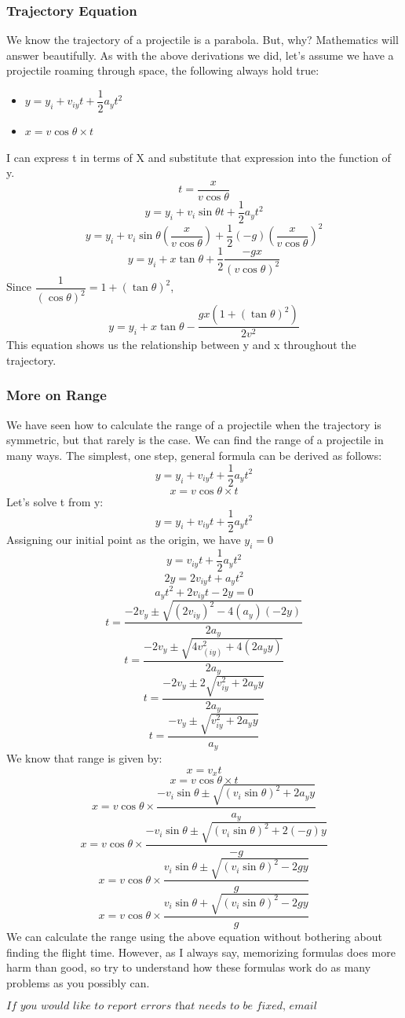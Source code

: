 \documentclass[9pt]{article}
\begin{document}
	\subsubsection*{Trajectory Equation}
	We know the trajectory of a projectile is a parabola. But, why? Mathematics will answer beautifully. As with the above derivations we did, let's assume we have a projectile roaming through space, the following always hold true:
	\begin{itemize}
		\item $y=y_i+v_{iy}t+\dfrac{1}{2}a_yt^2$
		\item $x=v\cos\theta\times t$
	\end{itemize}
	I can express t in terms of X and substitute that expression into the function of y.
	$$t=\dfrac{x}{v\cos\theta}$$
	$$y=y_i+v_i\sin\theta t+\dfrac{1}{2}a_yt^2$$
	$$y=y_i+v_i\sin\theta (\dfrac{x}{v\cos\theta})+\dfrac{1}{2}(-g)(\dfrac{x}{v\cos\theta})^2$$
	$$y=y_i+x\tan\theta+\dfrac{1}{2}\dfrac{-gx}{(v\cos\theta)^2}$$
	Since $\dfrac{1}{(\cos\theta)^2}=1+(\tan\theta)^2$,
	$$y=y_i+x\tan\theta-\dfrac{gx(1+(\tan\theta)^2)}{2v^2}$$
	This equation shows us the relationship between y and x throughout the trajectory.
	\subsubsection*{More on Range}
	We have seen how to calculate the range of a projectile when the trajectory is symmetric, but that rarely is the case. We can find the range of a projectile in many ways. The simplest, one step, general formula can be derived as follows:
	$$y=y_i+v_{iy}t+\dfrac{1}{2}a_yt^2$$
	$$x=v\cos\theta\times t$$
	Let's solve t from y:
	$$y=y_i+v_{iy}t+\dfrac{1}{2}a_yt^2$$
	Assigning our initial point as the origin, we have $y_i=0$
	$$y=v_{iy}t+\dfrac{1}{2}a_yt^2$$
	$$2y=2v_{iy}t+a_yt^2$$
	$$a_yt^2+2v_{iy}t-2y=0$$
	$$t=\dfrac{-2v_y\pm\sqrt{(2v_{iy})^2-4(a_y)(-2y)}}{2a_y}$$
	$$t=\dfrac{-2v_y\pm\sqrt{4v_(iy)^2+4(2a_yy)}}{2a_y}$$
	$$t=\dfrac{-2v_y\pm2\sqrt{v_{iy}^2+2a_yy}}{2a_y}$$
	$$t=\dfrac{-v_y\pm\sqrt{v_{iy}^2+2a_yy}}{a_y}$$
	We know that range is given by:
	$$x=v_xt$$
	$$x=v\cos\theta\times t$$
	$$x=v\cos\theta\times\dfrac{-v_i\sin\theta\pm\sqrt{(v_i\sin\theta)^2+2a_yy}}{a_y}$$
	$$x=v\cos\theta\times\dfrac{-v_i\sin\theta\pm\sqrt{(v_i\sin\theta)^2+2(-g)y}}{-g}$$
	$$x=v\cos\theta\times\dfrac{v_i\sin\theta\pm\sqrt{(v_i\sin\theta)^2-2gy}}{g}$$
	$$x=v\cos\theta\times\dfrac{v_i\sin\theta+\sqrt{(v_i\sin\theta)^2-2gy}}{g}$$
	We can calculate the range using the above equation without bothering about finding the flight time. However, as I always say, memorizing formulas does more harm than good, so try to understand how these formulas work do as many problems as you possibly can.
	
	$$\textit{If you would like to report errors that needs to be fixed, email aaron@stjohn.edu.et}$$
\end{document}
